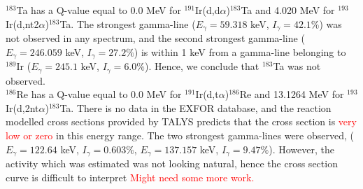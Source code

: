 \noindent $^{183}$Ta has a Q-value equal to 0.0 MeV for $^{191}$Ir(d,d$\alpha$)$^{183}$Ta and 4.020 MeV for $^{193}$Ir(d,nt2$\alpha$)$^{183}$Ta. The strongest gamma-line ($E_\gamma=59.318$ keV, $I_\gamma=42.1\%$) was not observed in any spectrum, and the second strongest gamma-line ($E_\gamma=246.059$ keV, $I_\gamma=27.2\%$) is within 1 keV from a gamma-line belonging to $^{189}$Ir ($E_\gamma=245.1$ keV, $I_\gamma=6.0\%$). Hence, we conclude that $^{183}$Ta was not observed. \\

\noindent $^{186}$Re has a Q-value equal to 0.0 MeV for $^{191}$Ir(d,t$\alpha$)$^{186}$Re and 13.1264 MeV for $^{193}$Ir(d,2nt$\alpha$)$^{183}$Ta. There is no data in the EXFOR database, and the reaction modelled cross sections provided by TALYS predicts that the cross section is \textcolor{red}{very low or zero} in this energy range. The two strongest gamma-lines were observed, ($E_\gamma=122.64$ keV, $I_\gamma=0.603\%$, $E_\gamma=137.157$ keV, $I_\gamma=9.47\%$). However, the activity which was estimated was not looking natural, hence the cross section curve is difficult to interpret \textcolor{red}{Might need some more work.} 


